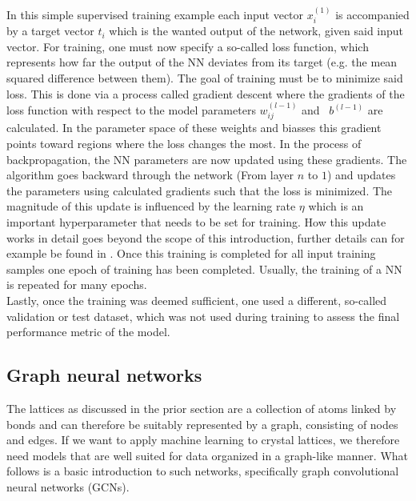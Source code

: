 \documentclass[11pt,a4paper]{article}
\begin{document}
In this simple supervised training example each input vector $x^{(1)}_i$ is accompanied by a target vector $t_i$ which is the wanted output of the network, given said input vector. 
For training, one must now specify a so-called loss function, which represents how far the output of the NN deviates from its target (e.g. the mean squared difference between them). 
The goal of training must be to minimize said loss. 
This is done via a process called gradient descent where the gradients of the loss function with respect to the model parameters $w_{ij}^{(l-1)}$ and  $ b^{(l-1)}$ are calculated. 
In the parameter space of these weights and biasses this gradient points toward regions where the loss changes the most. 
In the process of backpropagation, the NN parameters are now updated using these gradients. 
The algorithm goes backward through the network (From layer $n$ to $1$) and updates the parameters using calculated gradients such that the loss is minimized. 
The magnitude of this update is influenced by the learning rate $\eta$ which is an important hyperparameter that needs to be set for training. 
How this update works in detail goes beyond the scope of this introduction, further details can for example be found in \cite{kubatChapter5Artificial2017}. 
Once this training is completed for all input training samples one epoch of training has been completed. 
Usually, the training of a NN is repeated for many epochs. \\

Lastly, once the training was deemed sufficient, one used a different, so-called validation or test dataset, which was not used during training to assess the final performance metric of the model. 

\subsection{Graph neural networks}
\label{ssec:Graph neural networks}
The lattices as discussed in the prior section are a collection of atoms linked by bonds and can therefore be suitably represented by a graph, consisting of nodes and edges. 
If we want to apply machine learning to crystal lattices, we therefore need models that are well suited for data organized in a graph-like manner. 
What follows is a basic introduction to such networks, specifically graph convolutional neural networks (GCNs). \\
\end{document}
